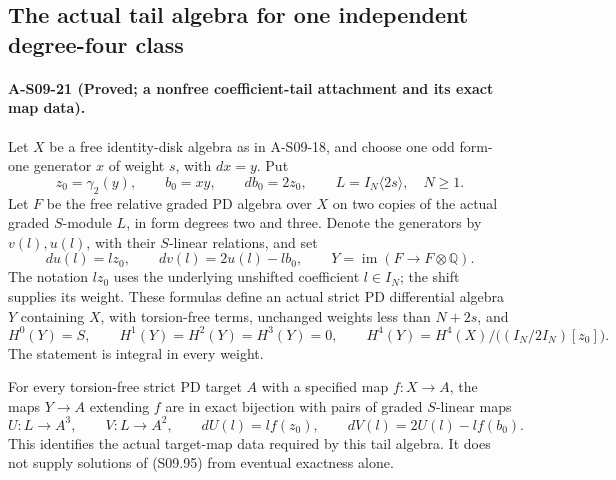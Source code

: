 \subsection{The actual tail algebra for one independent degree-four class}

\paragraph{A-S09-21 (Proved; a nonfree coefficient-tail attachment and its exact map data).}
Let $X$ be a free identity-disk algebra as in A-S09-18,
and choose one odd form-one generator $x$ of weight $s$,
with $dx=y$.  Put
\[
 z_0=\gamma_2(y),\qquad b_0=xy,\qquad db_0=2z_0,
 \qquad L=I_N\langle2s\rangle,\quad N\geq1.          \tag{S09.92}
\]
Let $F$ be the free relative graded PD algebra over
$X$ on two copies of the actual graded $S$-module $L$,
in form degrees two and three.  Denote the generators
by $v(l),u(l)$, with their $S$-linear relations, and set
\[
 du(l)=l z_0,\qquad dv(l)=2u(l)-l b_0,
 \qquad Y=\operatorname{im}(F\to F\otimes\mathbb Q).
 \tag{S09.93}
\]
The notation $l z_0$ uses the underlying unshifted
coefficient $l\in I_N$; the shift supplies its weight.
These formulas define an actual strict PD differential
algebra $Y$ containing $X$, with torsion-free terms,
unchanged weights less than $N+2s$, and
\[
 H^0(Y)=S,\qquad H^1(Y)=H^2(Y)=H^3(Y)=0,
 \qquad
 H^4(Y)=H^4(X)\big/\bigl((I_N/2I_N)[z_0]\bigr).
 \tag{S09.94}
\]
The statement is integral in every weight.

For every torsion-free strict PD target $A$ with a
specified map $f:X\to A$, the maps $Y\to A$ extending
$f$ are in exact bijection with pairs of graded
$S$-linear maps
\[
 U:L\to A^3,\qquad V:L\to A^2,
 \qquad dU(l)=l f(z_0),\qquad
 dV(l)=2U(l)-l f(b_0).                               \tag{S09.95}
\]
This identifies the actual target-map data required
by this tail algebra.  It does not supply solutions
of (S09.95) from eventual exactness alone.

